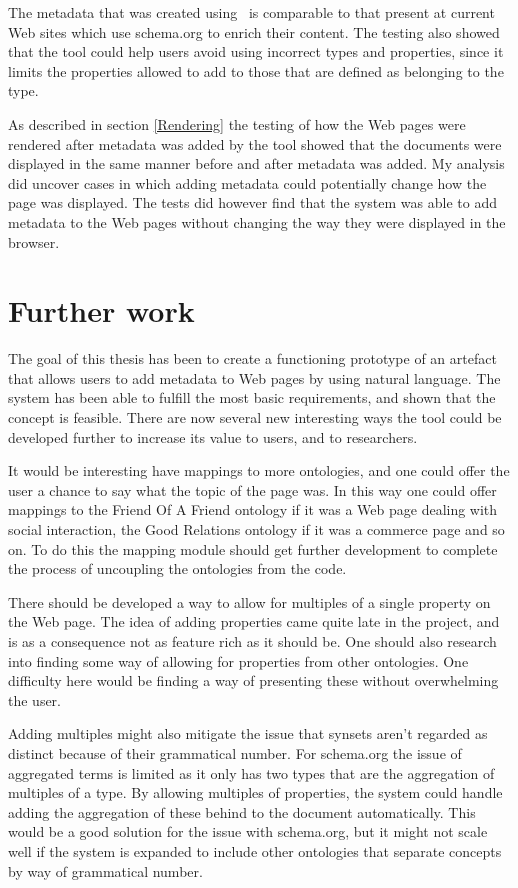 The metadata that was created using \theartefact\ is comparable to that present at current Web sites which use schema.org to
enrich their content.
The testing also showed that the tool could help users avoid using incorrect types and properties,
since it limits the properties allowed to add to those that are defined as belonging to the type.

As described in section \ref{Rendering} the testing of how the Web pages were rendered after metadata was added by the tool
showed that the documents were displayed in the same manner before and after metadata was added.
My analysis did uncover cases in which adding metadata could potentially change how the page was displayed.
The tests did however find that the system was able to add metadata to the Web pages without changing the way they were displayed in the browser.


\section{Further work}
The goal of this thesis has been to create a functioning prototype of an artefact that allows users to add metadata
to Web pages by using natural language.
The system has been able to fulfill the most basic requirements, and shown that the concept is feasible.
There are now several new interesting ways the tool could be developed further to increase its value to users,
and to researchers.

It would be interesting have mappings to more ontologies,
and one could offer the user a chance to say what the topic of the page was.
In this way one could offer mappings to the Friend Of A Friend ontology if it was a Web page dealing with
social interaction, the Good Relations ontology if it was a commerce page and so on.
To do this the mapping module should get further development to complete the process of uncoupling the ontologies
from the code.

There should be developed a way to allow for multiples of a single property on the Web page.
The idea of adding properties came quite late in the project,
and is as a consequence not as feature rich as it should be.
One should also research into finding some way of allowing for properties from other ontologies.
One difficulty here would be finding a way of presenting these without overwhelming the user.

Adding multiples might also mitigate the issue that synsets aren't regarded as distinct because of their grammatical number.
For schema.org the issue of aggregated terms is limited as it only has two types that are the aggregation of multiples of a type.
By allowing multiples of properties, the system could handle adding the aggregation of these behind to the document automatically.
This would be a good solution for the issue with schema.org,
but it might not scale well if the system is expanded to include other ontologies that separate concepts by way of grammatical number.

